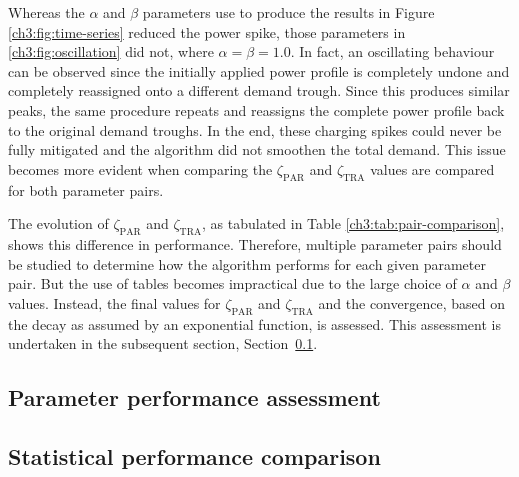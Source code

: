 Whereas the $\alpha$ and $\beta$ parameters use to produce the results in Figure \ref{ch3:fig:time-series} reduced the power spike, those parameters in \ref{ch3:fig:oscillation} did not, where $\alpha = \beta = 1.0$.
In fact, an oscillating behaviour can be observed since the initially applied power profile is completely undone and completely reassigned onto a different demand trough.
Since this produces similar peaks, the same procedure repeats and reassigns the complete power profile back to the original demand troughs.
In the end, these charging spikes could never be fully mitigated and the algorithm did not smoothen the total demand.
This issue becomes more evident when comparing the $\zeta_\text{PAR}$ and $\zeta_\text{TRA}$ values are compared for both parameter pairs.



The evolution of $\zeta_\text{PAR}$ and $\zeta_\text{TRA}$, as tabulated in Table \ref{ch3:tab:pair-comparison}, shows this difference in performance.
Therefore, multiple parameter pairs should be studied to determine how the algorithm performs for each given parameter pair.
But the use of tables becomes impractical due to the large choice of $\alpha$ and $\beta$ values.
Instead, the final values for $\zeta_\text{PAR}$ and $\zeta_\text{TRA}$ and the convergence, based on the decay as assumed by an exponential function, is assessed.
This assessment is undertaken in the subsequent section, Section~\ref{ch3:subsec:parameter-performance-assessment}.

\subsection{Parameter performance assessment}
\label{ch3:subsec:parameter-performance-assessment}

\subsection{Statistical performance comparison}
